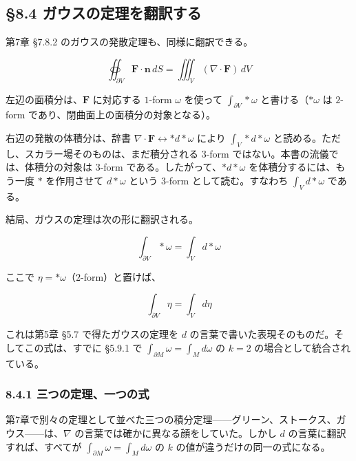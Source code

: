\documentclass[a4paper,12pt,openany]{book}
\begin{document}
\par\vspace{0.35em}\par

\hypertarget{ux30acux30a6ux30b9ux306eux5b9aux7406ux3092ux7ffbux8a33ux3059ux308b}{%
\subsection{§8.4
ガウスの定理を翻訳する}\label{ux30acux30a6ux30b9ux306eux5b9aux7406ux3092ux7ffbux8a33ux3059ux308b}}

第7章 §7.8.2 のガウスの発散定理も、同様に翻訳できる。

\[\oiint_{\partial V} \mathbf{F} \cdot \mathbf{n}\,dS = \iiint_V (\nabla \cdot \mathbf{F})\,dV\]

左辺の面積分は、\(\mathbf{F}\) に対応する \(1\)-form \(\omega\) を使って
\(\int_{\partial V} \ast\omega\) と書ける（\(\ast\omega\) は \(2\)-form
であり、閉曲面上の面積分の対象となる）。

右辺の発散の体積分は、辞書
\(\nabla\cdot\mathbf{F} \leftrightarrow \ast d\ast\omega\) により
\(\int_V \ast d\ast\omega\)
と読める。ただし、スカラー場そのものは、まだ積分される \(3\)-form
ではない。本書の流儀では、体積分の対象は \(3\)-form
である。したがって、\(\ast d\ast\omega\) を体積分するには、もう一度
\(\ast\) を作用させて \(d\ast\omega\) という \(3\)-form
として読む。すなわち \(\int_V d\ast\omega\) である。

結局、ガウスの定理は次の形に翻訳される。

\[\int_{\partial V} \ast\omega = \int_V d\ast\omega\]

ここで \(\eta = \ast\omega\)（\(2\)-form）と置けば、

\[\int_{\partial V} \eta = \int_V d\eta\]

これは第5章 §5.7 で得たガウスの定理を \(d\)
の言葉で書いた表現そのものだ。そしてこの式は、すでに §5.9.1 で
\(\int_{\partial M}\omega = \int_M d\omega\) の \(k=2\)
の場合として統合されている。

\hypertarget{ux4e09ux3064ux306eux5b9aux7406ux4e00ux3064ux306eux5f0f}{%
\subsubsection{8.4.1
三つの定理、一つの式}\label{ux4e09ux3064ux306eux5b9aux7406ux4e00ux3064ux306eux5f0f}}

第7章で別々の定理として並べた三つの積分定理——グリーン、ストークス、ガウス——は、\(\nabla\)
の言葉では確かに異なる顔をしていた。しかし \(d\)
の言葉に翻訳すれば、すべてが
\(\int_{\partial M}\omega = \int_M d\omega\) の \(k\)
の値が違うだけの同一の式になる。
\end{document}
